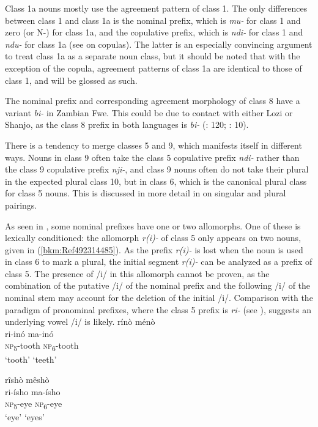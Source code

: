Class 1a nouns mostly use the agreement pattern of class 1. The only differences between class 1 and class 1a is the nominal prefix, which is \textit{mu-} for class 1 and zero (or N-) for class 1a, and the copulative prefix, which is \textit{ndi-} for class 1 and \textit{ndu-} for class 1a (see  on copulas). The latter is an especially convincing argument to treat class 1a as a separate noun class, but it should be noted that with the exception of the copula, agreement patterns of class 1a are identical to those of class 1, and will be glossed as such.

The nominal prefix and corresponding agreement morphology of class 8 have a variant \textit{bi-} in Zambian Fwe. This could be due to contact with either Lozi or Shanjo, as the class 8 prefix in both languages is \textit{bi-} (\citealt{Bostoen2009}: 120; \citealt{Fortune1977}: 10).

There is a tendency to merge classes 5 and 9, which manifests itself in different ways. Nouns in class 9 often take the class 5 copulative prefix \textit{ndi-} rather than the class 9 copulative prefix \textit{nji-}, and class 9 nouns often do not take their plural in the expected plural class 10, but in class 6, which is the canonical plural class for class 5 nouns. This is discussed in more detail in  on singular and plural pairings.

As seen in , some nominal prefixes have one or two allomorphs. One of these is lexically conditioned: the allomorph \textit{r(i)-} of class 5 only appears on two nouns, given in (\ref{bkm:Ref492314485}). As the prefix \textit{r(i)-} is lost when the noun is used in class 6 to mark a plural, the initial segment \textit{r(i)-} can be analyzed as a prefix of class 5. The presence of /i/ in this allomorph cannot be proven, as the combination of the putative /i/ of the nominal prefix and the following /i/ of the nominal stem may account for the deletion of the initial /i/. Comparison with the paradigm of pronominal prefixes, where the class 5 prefix is \textit{ri-} (see ), suggests an underlying vowel /i/ is likely.
\ea
\label{bkm:Ref492314485}
rínò   \tab\tab   ménò\\
ri-inó  \tab\tab    ma-inó\\
\textsc{np}\textsubscript{5}-tooth   \tab\tab \textsc{np}\textsubscript{6}-tooth\\
\glt ‘tooth’   \tab\tab   ‘teeth’
\z

\ea
rîshò  \tab\tab    mêshò\\
ri-ísho   \tab\tab   ma-ísho\\
\textsc{np}\textsubscript{5}-eye   \tab\tab \textsc{np}\textsubscript{6}-eye\\
\glt ‘eye’   \tab\tab   ‘eyes’
\z

